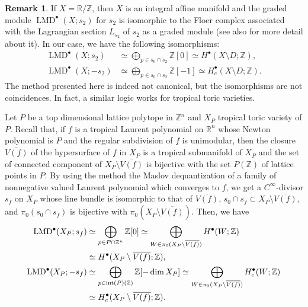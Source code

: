 \documentclass[a4paper,dvipdfmx,reqno,12pt]{amsart}
\theoremstyle{definition}
\newtheorem{remark}[theorem]{Remark}
\newcommand{\opn}[1]{\operatorname{#1}}
\numberwithin{equation}{section}
\begin{document}
\begin{remark}
If $X=\mathbb{R}/\mathbb{Z}$, then 
$X$ is an integral affine manifold and  
the graded module $\opn{LMD}^{\bullet}(X;s_2)$
for $s_2$ is isomorphic to the Floer complex
associated with the Lagrangian section $L_{s_2}$
of $s_2$ \cite[Remark 13]{MR1882331} as a graded
module (see also \cite[]{tsutsui2023graded}
for more detail about it). In our case, we have 
the following isomorphisms:
\begin{align}
\opn{LMD}^{\bullet}(X;s_{2}) &\simeq 
\bigoplus_{p\in s_0\cap s_{2}}\mathbb{Z}[0]
\simeq H^{\bullet}(X\setminus D;\mathbb{Z}), \\
\opn{LMD}^{\bullet}(X;-s_{2}) &\simeq
\bigoplus_{p\in s_0\cap s_{2}}\mathbb{Z}[-1]
\simeq H^{\bullet}_c(X\setminus D;\mathbb{Z}).
\end{align}
The method presented here is indeed not canonical,
but the isomorphisms are not coincidences. In fact, 
a similar logic works for tropical toric varieties.

Let $P$ be a top dimensional lattice polytope
in $\mathbb{Z}^{n}$ and $X_P$ tropical toric variety
of $P$. Recall that,
if $f$ is a tropical Laurent polynomial on 
$\mathbb{R}^{n}$ 
whose Newton polynomial is $P$ and the regular
subdivision of $f$ is unimodular, then the closure
$\overline{V(f)}$ of
the hypersurface of $f$ in $X_P$ is a tropical submanifold
of $X_P$ and the set of connected component of 
$X_P\setminus \overline{V(f)}$ is bijective with the set $P(\mathbb{Z})$
of lattice points in $P$.
By using the method the Maslov dequantization 
of a family of nonnegative valued Laurent polynomial
which converges to $f$, we get a 
$C^{\infty}$-divisor $s_f$ on $X_P$ whose line bundle is
isomorphic to that of $\overline{V(f)}$, 
$s_0\cap s_{f}\subset X_P\setminus \overline{V(f)}$,
and $\pi_0(s_0\cap s_{f})$ is bijective with 
$\pi_0(X_P\setminus \overline{V(f)})$.
Then, we have
\begin{align}
\opn{LMD}^{\bullet}(X_P;s_{f})
&\simeq \bigoplus_{p\in P\cap \mathbb{Z}^{n}}\mathbb{Z}[0]
\simeq \bigoplus_{W\in \pi_0(X_P\setminus \overline{V(f)})}
H^{\bullet}(W;\mathbb{Z}) \notag \\
&\simeq H^{\bullet}(X_P\setminus \overline{V(f)};\mathbb{Z}), \\
\opn{LMD}^{\bullet}(X_P;-s_{f})
&\simeq \bigoplus_{p\in \opn{int}(P)(\mathbb{Z})}
\mathbb{Z}[-\dim X_P]
\simeq \bigoplus_{W\in \pi_0(X_P\setminus \overline{V(f)})}
H^{\bullet}_c(W;\mathbb{Z}) \notag \\
&\simeq H^{\bullet}_c(X_P\setminus \overline{V(f)};\mathbb{Z}).
\end{align}


\end{remark}
\end{document}
